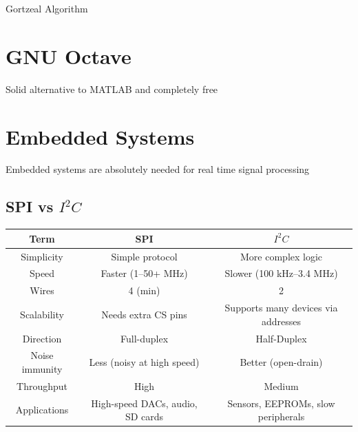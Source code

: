 \documentclass{article}
\begin{document}
\vspace{1em}
Gortzeal Algorithm 




































\newpage
\section{GNU Octave} 
Solid alternative to MATLAB and completely free
\newpage

\section{Embedded Systems}
Embedded systems are absolutely needed for real time signal processing

\subsection{SPI vs $I^2C$}
\begin{tabular}{|c|c|c|}
\hline
\textbf{Term} & \textbf{SPI} & \textbf{$I^2C$}  \\
\hline
Simplicity & Simple protocol & More complex logic \\
\hline
Speed & Faster (1–50+ MHz) & Slower (100 kHz–3.4 MHz) \\
\hline
Wires & 4 (min) & 2 \\
\hline
Scalability & Needs extra CS pins & Supports many devices via addresses \\
\hline
Direction & Full-duplex & Half-Duplex\\
\hline
Noise immunity & Less (noisy at high speed) & Better (open-drain)\\
\hline
Throughput & High & Medium \\
\hline
Applications & High-speed DACs, audio, SD cards & Sensors, EEPROMs, slow peripherals \\
\hline
\end{tabular}
\end{document}
